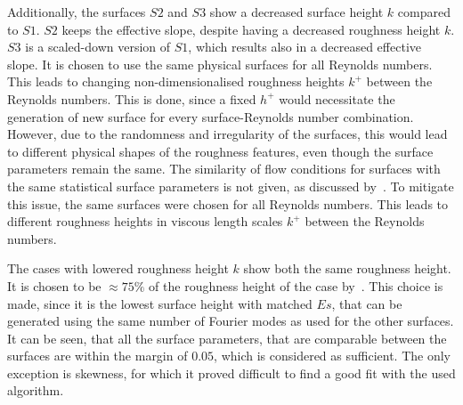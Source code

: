 Additionally, the surfaces $S2$ and $S3$ show a decreased surface height $k$ compared to $S1$.
$S2$ keeps the effective slope, despite having a decreased roughness height $k$.
$S3$ is a scaled-down version of $S1$, which results also in a decreased effective slope.
It is chosen to use the same physical surfaces for all Reynolds numbers.
This leads to changing non-dimensionalised roughness heights $k^+$ between the Reynolds numbers.
This is done, since a fixed $h^+$ would necessitate the generation of new surface for every surface-Reynolds number combination.
However, due to the randomness and irregularity of the surfaces, this would lead to different physical shapes of the roughness features, even though the surface parameters remain the same. 
The similarity of flow conditions for surfaces with the same statistical surface parameters is not given, as discussed by~\cite{forooghiUniversalRoughnessCorrelation2017,chungPredictingDragRough2021}.
To mitigate this issue, the same surfaces were chosen for all Reynolds numbers.
This leads to different roughness heights in viscous length scales $k^+$ between the Reynolds numbers.

The cases with lowered roughness height $k$ show both the same roughness height.
It is chosen to be $\approx 75\%$ of the roughness height of the case by~\cite{demaioDirectNumericalSimulation2023}.
This choice is made, since it is the lowest surface height with matched $Es$, that can be generated using the same number of Fourier modes as used for the other surfaces.
It can be seen, that all the surface parameters, that are comparable between the surfaces are within the margin of $0.05$, which is considered as sufficient.
The only exception is skewness, for which it proved difficult to find a good fit with the used algorithm.
